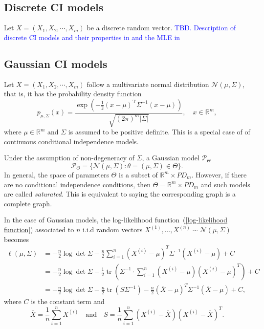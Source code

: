 \documentclass[10pt,a4paper]{article}
\begin{document}
\subsection{Discrete CI models}
Let $X=(X_1,X_2,\cdots,X_m)$ be a discrete random vector.
\textcolor{blue}{TBD. Description of discrete CI models and their properties in \cite[pp. 70-73]{drton2008lectures} and the MLE in \cite[pp. 36-43]{drton2008lectures}}
\subsection{Gaussian CI models}
Let $X=(X_1,X_2,\cdots,X_m)$ follow a multivariate normal distribution $\mathcal{N}(\mu,\Sigma)$, that is, it has the probability density function
\[p_{\mu,\Sigma}(x) = \frac{\exp\left(-\frac 1 2 ({ x}-{\mu})^\mathrm{T}{\Sigma}^{-1}({x}-{\mu})\right)}{\sqrt{(2\pi)^m|\Sigma|}}, \quad x \in \mathbb{R}^m,\]
where $\mu \in \mathbb{R}^m$ and $\Sigma$ is assumed to be positive definite. This is a special case of of continuous conditional independence models.

Under the assumption of  non-degeneracy of $\Sigma$, a Gaussian model $\mathcal{P}_\Theta$
\[\mathcal{P}_\Theta=\{\mathcal{N}(\mu,\Sigma):\theta=(\mu,\Sigma)\in \Theta\}.\]
In general, the space of parameters $\Theta$ is a subset of $\mathbb{R}^m \times PD_m$. However, if there are no conditional independence conditions, then $\Theta=\mathbb{R}^m \times PD_m$ and such models are called \emph{saturated}. This is equivalent to saying the corresponding graph is a complete graph.

In the case of Gaussian models, the log-likelihood function~(\ref{log-likelihood function}) associated to $n$ i.i.d random vectors $X^{(1)}, \dots, X^{(n)} \sim \mathcal{N}(\mu,\Sigma)$  becomes 
\begin{align}\label{Gaussian log-likelihood}
\ell(\mu,\Sigma)& =-\frac{n}{2}\log \det \Sigma - \frac{n}{2}\sum_{i=1}^n (X^{(i)}-\mu)^T\Sigma^{-1}(X^{(i)}-\mu)+C \nonumber\\
		& =-\frac{n}{2}\log \det \Sigma - \frac{1}{2}\operatorname{tr}\left(\Sigma^{-1}\cdot \sum_{i=1}^n(X^{(i)}-\mu)(X^{(i)}-\mu)^T\right)+C \nonumber\\
		&=-\frac{n}{2}\log \det \Sigma - \frac{n}{2}\operatorname{tr}\left(S\Sigma^{-1}\right)- \frac{n}{2}\left(\overline{X}-\mu\right)^T\Sigma^{-1}\left(\overline{X}-\mu\right)+C,
\end{align}
where $C$ is the constant term and
\[\overline{X}=\frac{1}{n}\sum_{i=1}^nX^{(i)} \quad \text{and} \quad S=\frac{1}{n}\sum_{i=1}^n(X^{(i)}-\overline{X})(X^{(i)}-\overline{X})^T.\]
\end{document}
